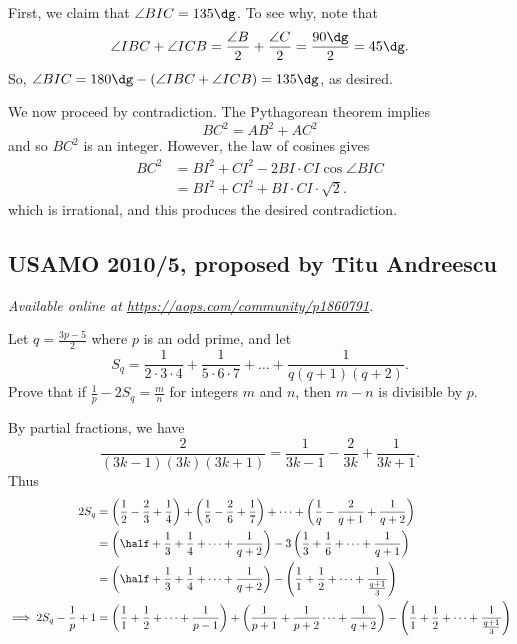 \documentclass[11pt]{scrartcl}
\begin{document}
First, we claim that $\angle BIC = 135\dg$.
To see why, note that
\[ \angle IBC + \angle ICB = \frac{\angle B}{2} + \frac{\angle C}{2}
  = \frac{90\dg}{2} = 45\dg. \]
So, $\angle BIC = 180\dg - (\angle IBC + \angle ICB) = 135\dg$, as desired.

We now proceed by contradiction.
The Pythagorean theorem implies
\[ BC^2 = AB^2 + AC^2 \]
and so $BC^2$ is an integer.
However, the law of cosines gives
\begin{align*}
  BC^2 &= BI^2 + CI^2 - 2 BI \cdot CI \cos \angle BIC \\
  &= BI^2 + CI^2 + BI \cdot CI \cdot \sqrt 2.
\end{align*}
which is irrational, and this produces the desired contradiction.
\pagebreak

\subsection{USAMO 2010/5, proposed by Titu Andreescu}
\textsl{Available online at \url{https://aops.com/community/p1860791}.}
\begin{mdframed}[style=mdpurplebox,frametitle={Problem statement}]
Let $q = \frac{3p-5}{2}$ where $p$ is an odd prime, and let
\[ S_q = \frac{1}{2\cdot 3 \cdot 4} + \frac{1}{5\cdot 6 \cdot 7}
+ \dots + \frac{1}{q(q+1)(q+2)}. \]
Prove that if $\frac{1}{p}-2S_q = \frac{m}{n}$ for integers $m$ and $n$,
then $m - n$ is divisible by $p$.
\end{mdframed}
By partial fractions, we have
\[
  \frac{2}{(3k-1)(3k)(3k+1)}
  = \frac{1}{3k-1} - \frac{2}{3k} + \frac{1}{3k+1}.
\]
Thus
\begin{align*}
  2S_q
  &= \left( \frac12 - \frac23 + \frac14 \right)
  + \left( \frac 15 - \frac26 + \frac17 \right)
  + \dots
  + \left( \frac1q - \frac2{q+1} + \frac{1}{q+2} \right) \\
  &= \left( \half + \frac13 + \frac14 + \dots + \frac{1}{q+2} \right)
  - 3\left( \frac13 + \frac 16 + \dots + \frac{1}{q+1} \right) \\
  &= \left( \half + \frac13 + \frac14 + \dots + \frac{1}{q+2} \right)
  - \left( \frac11 + \frac 12 + \dots + \frac{1}{\frac{q+1}{3}} \right) \\
  \implies 2S_q - \frac1p + 1
  &=  \left( \frac11 + \frac12 + \dots + \frac{1}{p-1} \right)
  + \left( \frac{1}{p+1} + \frac{1}{p+2} \dots + \frac{1}{q+2} \right)
  - \left( \frac11 + \frac 12 + \dots + \frac{1}{\frac{q+1}{3}} \right)
\end{align*}
\end{document}
